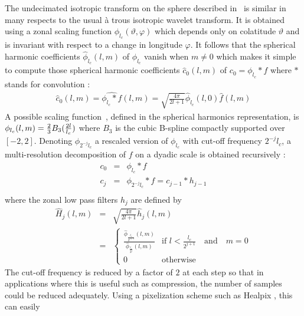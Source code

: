 The undecimated isotropic transform on the sphere described in~\citep{starck:sta05_2} is similar in many respects to the usual 
\og{}\`a trous \fg{} isotropic wavelet transform. It is obtained using a zonal scaling function $\phi_{l_c}(\vartheta, \varphi)$ 
which depends only on colatitude $\vartheta$ and is invariant with respect to a change in longitude $\varphi$. It follows that 
the spherical harmonic coefficients $\hat \phi_{l_c} (l,m)$ of $\phi_{l_c}$ vanish when $m \ne 0$ which makes it simple to compute 
those spherical harmonic coefficients $\hat c_{0}(l,m)$ of $c_0 = \phi_{l_c} * f$ where $*$ stands for convolution :
\begin{eqnarray}
 \hat c_{0}(l,m) = \widehat{\phi_{l_c} * f} (l,m) = \sqrt{\frac{4\pi}{2l+1} } \hat \phi_{l_c} (l,0) \hat f(l,m) 
\end{eqnarray}
A possible scaling function~\citep{starck:book98}, defined in the spherical harmonics representation, is $\phi_{l_c}(l, m) = {2 \over 3} B_{3} ( { {2 l} \over {l_{c} } } )$ 
where $B_{3}$ is the cubic B-spline compactly supported over $[-2, 2]$. Denoting $\phi_{2^{-j} l_{c} }$ a rescaled version of 
$\phi_{l_{c}}$ with cut-off frequency $2^{-j} l_{c}$, a multi-resolution decomposition of $f$ on a dyadic scale is obtained recursively : 
\begin{eqnarray}
c_0   & = &  \phi_{ l_{c} }  * f    \nonumber    \\
c_j    &=&   \phi_{2^{-j}  l_{c}  }  * f  =   c_{j-1} * h_{j-1} \nonumber    \\
\end{eqnarray}
where the zonal low pass filters $h_{j}$ are defined by 
\begin{eqnarray}
 \hat{H}_{j}(l,m)  & =  &  \sqrt{\frac{4\pi}{2l+1} }  \hat h_{j}(l,m)  \nonumber \\
 &  =  & \left\{
  \begin{array}{ll}
  \frac {   \hat \phi_{\frac{l_{c}}{2^{j+1}} }(l,m)   }   {  \hat  \phi_{  \frac{l_{c}}{2^{j}} }(l,m)   } & \mbox{if }  l  < \frac{ l_{c}} {2^{j+1}} \quad \textrm{and}\quad m = 0\\
0 & \mbox{otherwise } \ 
  \end{array}
  \right.
\end{eqnarray}
The cut-off frequency is reduced by a factor of $2$ at each step so that in applications where this is useful such as compression, 
the number of samples could be reduced adequately. Using a pixelization scheme such as Healpix \citep{pixel:healpix}, this can easily 
